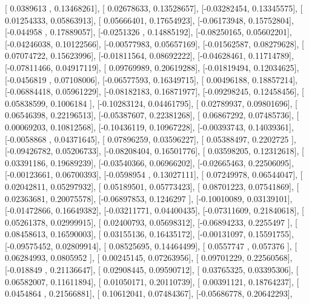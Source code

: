 \documentclass{article}
\begin{document}
       [ 0.0389613 ,  0.13468261],
       [ 0.02678633,  0.13528657],
       [-0.03282454,  0.13345575],
       [ 0.01254333,  0.05863913],
       [ 0.05666401,  0.17654923],
       [-0.06173948,  0.15752804],
       [-0.044958  ,  0.17889057],
       [-0.0251326 ,  0.14885192],
       [-0.08250165,  0.05602201],
       [-0.04246038,  0.10122566],
       [-0.00577983,  0.05657169],
       [-0.01562587,  0.08279628],
       [ 0.07074722,  0.15623996],
       [-0.01811564,  0.08692222],
       [-0.04628461,  0.11714789],
       [-0.07811466,  0.04917119],
       [ 0.09769989,  0.20619288],
       [-0.01819494,  0.12034625],
       [-0.0456819 ,  0.07108006],
       [-0.06577593,  0.16349715],
       [ 0.00496188,  0.18857214],
       [-0.06884418,  0.05961229],
       [-0.08182183,  0.16871977],
       [-0.09298245,  0.12458456],
       [ 0.05838599,  0.1006184 ],
       [-0.10283124,  0.04461795],
       [ 0.02789937,  0.09801696],
       [ 0.06546398,  0.22196513],
       [-0.05387607,  0.22381268],
       [ 0.06867292,  0.07485736],
       [ 0.00069203,  0.10812568],
       [-0.10436119,  0.10967228],
       [-0.00393743,  0.14039361],
       [-0.0058868 ,  0.04371645],
       [ 0.07896259,  0.03596227],
       [ 0.05388497,  0.2202725 ],
       [-0.09426782,  0.05206733],
       [-0.08208404,  0.16501776],
       [ 0.03598205,  0.12312618],
       [ 0.03391186,  0.19689239],
       [-0.03540366,  0.06966202],
       [-0.02665463,  0.22506095],
       [-0.00123661,  0.06700393],
       [-0.0598954 ,  0.13027111],
       [ 0.07249978,  0.06544047],
       [ 0.02042811,  0.05297932],
       [ 0.05189501,  0.05773423],
       [ 0.08701223,  0.07541869],
       [ 0.02363681,  0.20075578],
       [-0.06897853,  0.1246297 ],
       [-0.10010089,  0.03139101],
       [-0.01472866,  0.16649382],
       [-0.03211771,  0.04400435],
       [-0.07311609,  0.21840618],
       [ 0.05261378,  0.02999915],
       [ 0.02400793,  0.05698312],
       [-0.06894233,  0.2255497 ],
       [ 0.08458613,  0.16590003],
       [ 0.03155136,  0.16435172],
       [-0.00131097,  0.15591755],
       [-0.09575452,  0.02809914],
       [ 0.08525695,  0.14464499],
       [ 0.0557747 ,  0.057376  ],
       [ 0.06284993,  0.0805952 ],
       [ 0.00245145,  0.07263956],
       [ 0.09701229,  0.22560568],
       [-0.018849  ,  0.21136647],
       [ 0.02908445,  0.09590712],
       [ 0.03765325,  0.03395306],
       [ 0.06582007,  0.11611894],
       [ 0.01050171,  0.20110739],
       [ 0.00391121,  0.18764237],
       [ 0.0454864 ,  0.21566881],
       [ 0.10612041,  0.07484367],
       [-0.05686778,  0.20642293],
\end{document}
